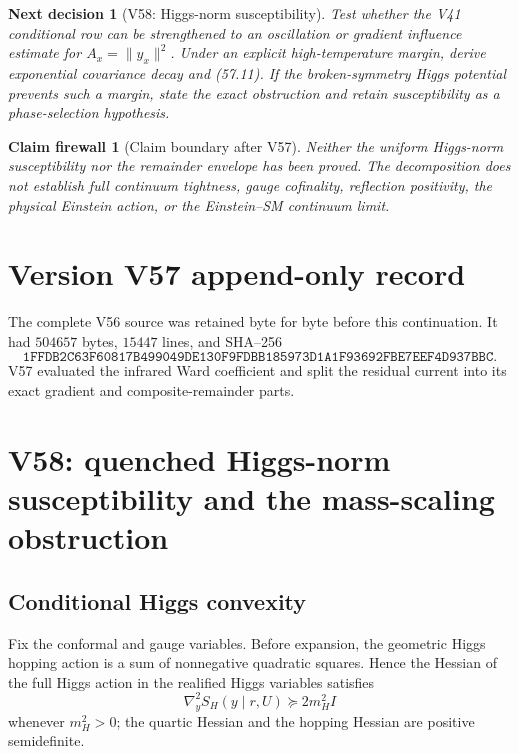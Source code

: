 \documentclass[11pt]{article}
\newtheorem{firewall}[theorem]{Claim firewall}
\newtheorem{decision}[theorem]{Next decision}
\theoremstyle{remark}
\begin{document}
\begin{decision}[V58: Higgs-norm susceptibility]
\label{dec:v17v57-next}
Test whether the V41 conditional row can be strengthened to an
oscillation or gradient influence estimate for
\(A_x=\|y_x\|^2\).  Under an explicit high-temperature margin, derive
exponential covariance decay and (57.11).  If the broken-symmetry
Higgs potential prevents such a margin, state the exact obstruction
and retain susceptibility as a phase-selection hypothesis.
\end{decision}

\begin{firewall}[Claim boundary after V57]
\label{fire:v17v57}
Neither the uniform Higgs-norm susceptibility nor the remainder
envelope has been proved.  The decomposition does not establish full
continuum tightness, gauge cofinality, reflection positivity, the
physical Einstein action, or the Einstein--SM continuum limit.
\end{firewall}

\section*{Version V57 append-only record}
The complete V56 source was retained byte for byte before this
continuation.  It had \(504657\) bytes, \(15447\) lines, and SHA--256
\[
 \texttt{1FFDB2C63F60817B499049DE130F9FDBB185973D1A1F93692FBE7EEF4D937BBC}.
\]
V57 evaluated the infrared Ward coefficient and split the residual
current into its exact gradient and composite-remainder parts.


\section{V58: quenched Higgs-norm susceptibility and the mass-scaling
obstruction}
\label{sec:v17v58}

\subsection{Conditional Higgs convexity}

Fix the conformal and gauge variables.  Before expansion, the
geometric Higgs hopping action is a sum of nonnegative quadratic
squares.  Hence the Hessian of the full Higgs action in the realified
Higgs variables satisfies
\[
 \nabla_y^2S_H(y\mid r,U)
 \succeq2m_H^2I                                  \tag{58.1}
\]
whenever \(m_H^2>0\); the quartic Hessian and the hopping Hessian are
positive semidefinite.
\end{document}
